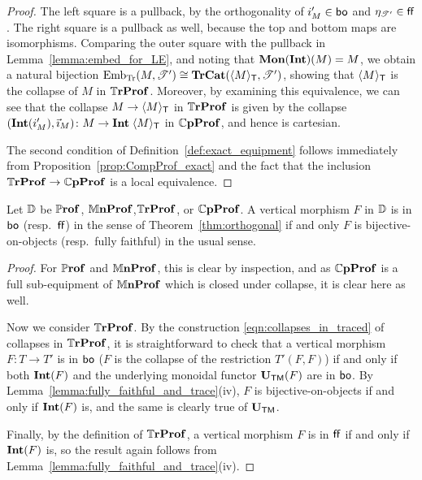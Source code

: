 \documentclass[11pt,oneside,article]{memoir}
\begin{document}
\begin{proof}
   The left square is a pullback, by the orthogonality of $i'_M\in\mathsf{bo}$ and $\eta_{\mathscr{T}'}\in\mathsf{ff}$. The
   right square is a pullback as well, because the top and bottom maps are isomorphisms. Comparing
   the outer square with the pullback in Lemma~\ref{lemma:embed_for_LE}, and noting that
   $\mathbf{Mon}(\mathbf{Int})(M)=M$, we obtain a natural bijection
   $\mathrm{Emb}_{\mathrm{Tr}}(M,\mathscr{T}')\cong\mathbf{TrCat}(\langle M\rangle_{\mathsf{T}},\mathscr{T}')$, showing that
   $\langle M\rangle_{\mathsf{T}}$ is the collapse of $M$ in $\mathbb{T}\mathbf{rProf}$. Moreover, by examining this
   equivalence, we can see that the collapse $M\to \langle M\rangle_{\mathsf{T}}$ in $\mathbb{T}\mathbf{rProf}$ is given by
   the collapse $(\mathbf{Int}(i'_M),\vec{\imath}_M)\colon M\to\mathbf{Int}\;\langle M\rangle_{\mathsf{T}}$ in $\mathbb{C}\mathbf{pProf}$,
   and hence is cartesian.

   The second condition of Definition~\ref{def:exact_equipment} follows immediately from
   Proposition~\ref{prop:CompProf_exact} and the fact that the inclusion $\mathbb{T}\mathbf{rProf}\to\mathbb{C}\mathbf{pProf}$ is
   a local equivalence.
\end{proof}

\begin{proposition}
      \label{prop:boff_well_named}
   Let $\mathbb{D}$ be $\mathbb{P}\mathbf{rof}$, $\mathbb{M}\mathbf{nProf}$,$\mathbb{T}\mathbf{rProf}$, or $\mathbb{C}\mathbf{pProf}$. A vertical morphism $F$ in
   $\mathbb{D}$ is in $\mathsf{bo}$ (resp.\ $\mathsf{ff}$) in the sense of Theorem~\ref{thm:orthogonal} if and only $F$
   is bijective-on-objects (resp.\ fully faithful) in the usual sense.
\end{proposition}
\begin{proof}
   For $\mathbb{P}\mathbf{rof}$ and $\mathbb{M}\mathbf{nProf}$, this is clear by inspection, and as $\mathbb{C}\mathbf{pProf}$ is a full
   sub-equipment of $\mathbb{M}\mathbf{nProf}$ which is closed under collapse, it is clear here as well.

   Now we consider $\mathbb{T}\mathbf{rProf}$. By the construction \eqref{eqn:collapses_in_traced} of collapses in
   $\mathbb{T}\mathbf{rProf}$, it is straightforward to check that a vertical morphism $F\colon T\to T'$ is in $\mathsf{bo}$
   ($F$ is the collapse of the restriction $T'(F,F)$) if and only if both $\mathbf{Int}(F)$ and the
   underlying monoidal functor $\mathbf{U}_{\mathsf{TM}}(F)$ are in $\mathsf{bo}$. By
   Lemma~\ref{lemma:fully_faithful_and_trace}(iv), $F$ is bijective-on-objects if and only if
   $\mathbf{Int}(F)$ is, and the same is clearly true of $\mathbf{U}_{\mathsf{TM}}$.

   Finally, by the definition of $\mathbb{T}\mathbf{rProf}$, a vertical morphism $F$ is in $\mathsf{ff}$ if and only if
   $\mathbf{Int}(F)$ is, so the result again follows from Lemma~\ref{lemma:fully_faithful_and_trace}(iv).
\end{proof}
\end{document}
